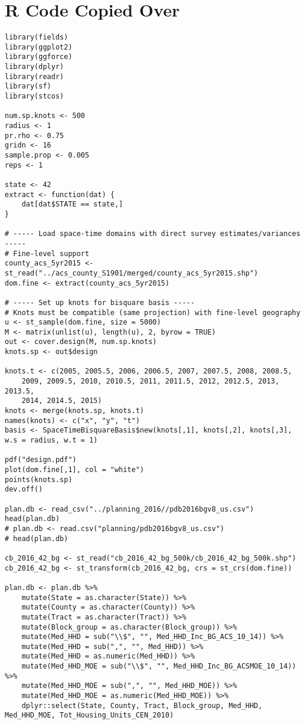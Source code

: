 \documentclass[12pt]{article}
\begin{document}
\appendix
\clearpage

\section{R Code Copied Over}
\label{sec:code}

\begin{footnotesize}
\begin{verbatim}
library(fields)
library(ggplot2)
library(ggforce)
library(dplyr)
library(readr)
library(sf)
library(stcos)

num.sp.knots <- 500
radius <- 1
pr.rho <- 0.75
gridn <- 16
sample.prop <- 0.005
reps <- 1

state <- 42
extract <- function(dat) {
    dat[dat$STATE == state,]
}

# ----- Load space-time domains with direct survey estimates/variances -----
# Fine-level support
county_acs_5yr2015 <- st_read("../acs_county_S1901/merged/county_acs_5yr2015.shp")
dom.fine <- extract(county_acs_5yr2015)

# ----- Set up knots for bisquare basis -----
# Knots must be compatible (same projection) with fine-level geography
u <- st_sample(dom.fine, size = 5000)
M <- matrix(unlist(u), length(u), 2, byrow = TRUE)
out <- cover.design(M, num.sp.knots)
knots.sp <- out$design

knots.t <- c(2005, 2005.5, 2006, 2006.5, 2007, 2007.5, 2008, 2008.5,
    2009, 2009.5, 2010, 2010.5, 2011, 2011.5, 2012, 2012.5, 2013, 2013.5,
    2014, 2014.5, 2015)
knots <- merge(knots.sp, knots.t)
names(knots) <- c("x", "y", "t")
basis <- SpaceTimeBisquareBasis$new(knots[,1], knots[,2], knots[,3], w.s = radius, w.t = 1)

pdf("design.pdf")
plot(dom.fine[,1], col = "white")
points(knots.sp)
dev.off()

plan.db <- read_csv("../planning_2016//pdb2016bgv8_us.csv")
head(plan.db)
# plan.db <- read.csv("planning/pdb2016bgv8_us.csv")
# head(plan.db)

cb_2016_42_bg <- st_read("cb_2016_42_bg_500k/cb_2016_42_bg_500k.shp")
cb_2016_42_bg <- st_transform(cb_2016_42_bg, crs = st_crs(dom.fine))

plan.db <- plan.db %>%
    mutate(State = as.character(State)) %>%
    mutate(County = as.character(County)) %>%
    mutate(Tract = as.character(Tract)) %>%
    mutate(Block_group = as.character(Block_group)) %>%
    mutate(Med_HHD = sub("\\$", "", Med_HHD_Inc_BG_ACS_10_14)) %>%
    mutate(Med_HHD = sub(",", "", Med_HHD)) %>%
    mutate(Med_HHD = as.numeric(Med_HHD)) %>%
    mutate(Med_HHD_MOE = sub("\\$", "", Med_HHD_Inc_BG_ACSMOE_10_14)) %>%
    mutate(Med_HHD_MOE = sub(",", "", Med_HHD_MOE)) %>%
    mutate(Med_HHD_MOE = as.numeric(Med_HHD_MOE)) %>%
    dplyr::select(State, County, Tract, Block_group, Med_HHD, Med_HHD_MOE, Tot_Housing_Units_CEN_2010)


\end{verbatim}
\end{footnotesize}
\end{document}
